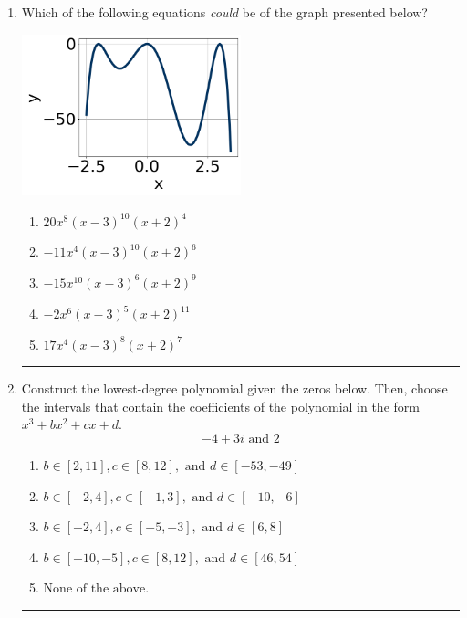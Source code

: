 \documentclass[14pt]{extbook}
\newcommand{\litem}[1]{\item#1\hspace*{-1cm}\rule{\textwidth}{0.4pt}}
\begin{document}
\begin{enumerate}
{\begin{enumerate}[label=\Alph*.]
\end{enumerate} }
\litem{
Which of the following equations \textit{could} be of the graph presented below?
\begin{center}
    \includegraphics[width=0.5\textwidth]{../Figures/polyGraphToFunctionC.png}
\end{center}
\begin{enumerate}[label=\Alph*.]
\item \( 20x^{8} (x - 3)^{10} (x + 2)^{4} \)
\item \( -11x^{4} (x - 3)^{10} (x + 2)^{6} \)
\item \( -15x^{10} (x - 3)^{6} (x + 2)^{9} \)
\item \( -2x^{6} (x - 3)^{5} (x + 2)^{11} \)
\item \( 17x^{4} (x - 3)^{8} (x + 2)^{7} \)

\end{enumerate} }
\litem{
Construct the lowest-degree polynomial given the zeros below. Then, choose the intervals that contain the coefficients of the polynomial in the form $x^3+bx^2+cx+d$.\[ -4 + 3 i \text{ and } 2 \]\begin{enumerate}[label=\Alph*.]
\item \( b \in [2, 11], c \in [8, 12], \text{ and } d \in [-53, -49] \)
\item \( b \in [-2, 4], c \in [-1, 3], \text{ and } d \in [-10, -6] \)
\item \( b \in [-2, 4], c \in [-5, -3], \text{ and } d \in [6, 8] \)
\item \( b \in [-10, -5], c \in [8, 12], \text{ and } d \in [46, 54] \)
\item \( \text{None of the above.} \)


\end{enumerate}}
\end{enumerate}
\end{document}
